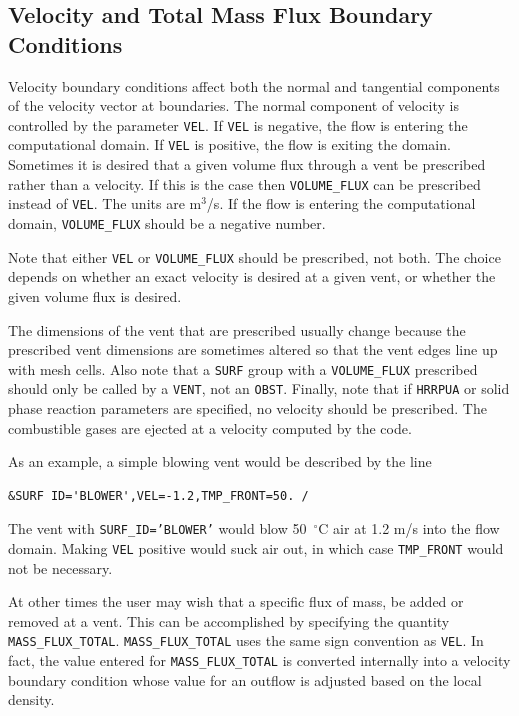\documentclass[11pt]{book}
\newcommand{\ct}{\tt\small}
\begin{document}
\subsection{Velocity and Total Mass Flux Boundary Conditions}
 
Velocity boundary conditions affect both the normal and tangential
components of the velocity vector at boundaries.
The normal component of velocity is controlled by the parameter
{\ct VEL}. If {\ct VEL} is negative, the flow is entering the
computational domain. If {\ct VEL} is positive, the flow is exiting the
domain.
Sometimes it is desired that a given volume flux through a vent
be prescribed rather than a velocity. If this is the case then
{\ct VOLUME\_FLUX} can be prescribed instead of {\ct VEL}. The units
are m$^3$/s.
If the flow is entering the computational domain, {\ct VOLUME\_FLUX}
should be a negative number.
\begin{warning}
\noindent
Note that either {\ct VEL} or {\ct VOLUME\_FLUX} should be prescribed,
not both.  The choice depends on whether an exact velocity is desired at a
given vent, or whether the given volume flux is desired.
\end{warning}
The dimensions of the vent that are prescribed usually change
because the prescribed vent dimensions are sometimes altered so that
the vent edges line up with mesh cells. Also note that a {\ct SURF}
group with a {\ct VOLUME\_FLUX} prescribed should only be called by a
{\ct VENT}, not an {\ct OBST}.
Finally, note that if {\ct HRRPUA} or solid phase reaction parameters are
specified, no velocity should be prescribed. The combustible gases
are ejected at a velocity computed by the code.

As an example, a simple blowing vent would be described by the line

\footnotesize
\begin{verbatim}
&SURF ID='BLOWER',VEL=-1.2,TMP_FRONT=50. /
\end{verbatim}
\normalsize

\noindent
The vent with {\ct SURF\_ID='BLOWER'} would blow 50~$^\circ$C
air at 1.2 m/s into the flow domain. Making {\ct VEL} positive would
suck air out, in which case {\ct TMP\_FRONT} would not be necessary.

At other times the user may wish that a specific flux of mass, be added or removed at
a vent.  This can be accomplished by specifying the quantity {\ct MASS\_FLUX\_TOTAL}.
{\ct MASS\_FLUX\_TOTAL} uses the same sign convention as {\ct VEL}.  In fact, the value entered for
{\ct MASS\_FLUX\_TOTAL} is converted internally into a velocity boundary condition whose value
for an outflow is adjusted based on the local density.
\end{document}
